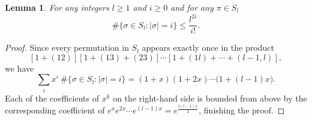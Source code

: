 \documentclass[12pt]{amsart}
\theoremstyle{plain}
\newtheorem{lemma}{Lemma}
\theoremstyle{remark}
\begin{document}
\begin{lemma}
\label{lem:nie-za-duzo}
For any integers $l\geq 1$ and $i\geq 0$ and for any $\pi\in S_l$
\begin{equation}
\label{eq:iloscpermutacji}
 \# \{ \sigma\in S_l : | \sigma | = i \} \leq \frac{l^{2i}}{i!}.
\end{equation}
\end{lemma}
\begin{proof}
Since every permutation in $S_l$ appears exactly once in the product
$$ [1+ (12) ] [1+ (13)+(23) ] \cdots [1+(1l)+\cdots+(l-1,l)], $$
we have
$$ \sum_i x^i\ \#\big\{ \sigma\in S_l : | \sigma | = i \big\} = (1+x) (1+2x)
\cdots \big(1+(l- 1) x\big).$$
Each of the coefficients of $x^k$ on the right-hand side is bounded from above
by the
corresponding coefficient of $e^{x} e^{2x} \cdots
e^{(l-1)x}=e^{\frac{l(l-1)x}{2}}$, finishing the proof.
\end{proof}
\end{document}

